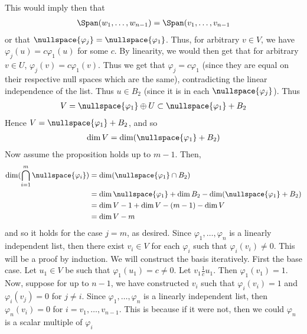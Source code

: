\documentclass{book}
\begin{document}
\begin{enumerate}[label=\arabic*)]
      This would imply then that 
      \begin{align*}
        \Span(w_1, \dots, w_{n - 1}) = \Span(v_1, \dots, v_{n - 1} 
      \end{align*}
      or that $\nullspace{\varphi_j} = \nullspace{\varphi_1}$. Thus, for arbitrary $v \in V$, we have $\varphi_j(u) = c\varphi_1(u)$ for some $c$. By linearity, we would then get that for
      arbitrary $v \in U$, $\varphi_j(v) = c\varphi_1(v)$. Thus we get that $\varphi_j = c\varphi_1$ (since they are equal on their respective null spaces which are the same), contradicting
      the linear independence of the list. Thus $u \in B_2$ (since it is in each $\nullspace{\varphi_j}$). Thus 
      \begin{align*}
        V = \nullspace{\varphi_1} \oplus U \subset \nullspace{\varphi_1} + B_2
      \end{align*}
      Hence $V = \nullspace{\varphi_1} + B_2$, and so 
      \begin{align*}
        \dim{V} = \dim(\nullspace{\varphi_1} + B_2)
      \end{align*}
      Now assume the proposition holds up to $m - 1$. Then,
      \begin{align*}
        \dim(\bigcap_{i = 1}^{m}\nullspace{\varphi_i}) & = \dim(\nullspace{\varphi_1} \cap B_2) \\
        & = \dim{\nullspace{\varphi_1}} + \dim{B_2} - \dim(\nullspace{\varphi_1} + B_2) \\
        & = \dim{V} - 1 + \dim{V} - (m - 1) - \dim{V} \\
        & = \dim{V} - m
      \end{align*}
      and so it holds for the case $j = m$, as desired.
    \ii
      Since $\varphi_1, \dots, \varphi_n$ is a linearly independent list, then there exist $v_i \in V$ for each $\varphi_i$ such that $\varphi_i(v_i) \neq 0$. This will be a proof by
      induction. We will construct the basis iteratively. First the base case. Let $u_1 \in V$ be such that $\varphi_1(u_1) = c \neq 0$. Let $v_1 \frac{1}{c}u_1$. Then $\varphi_1(v_1) = 1$.
      Now, suppose for up to $n - 1$, we have constructed $v_i$ such that $\varphi_i(v_i) = 1$ and $\varphi_i(v_j) = 0$ for $j \neq i$. Since $\varphi_1, \dots, \varphi_n$ is a linearly
      independent list, then $\varphi_n(v_i) = 0$ for $i = v_1, \dots, v_{n - 1}$. This is because if it were not, then we could $\varphi_n$ is a scalar multiple of $\varphi_i$ 


\end{enumerate}
\end{document}

